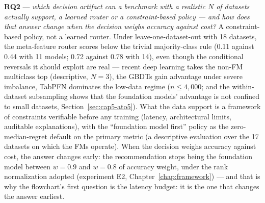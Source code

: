 \textbf{RQ2} --- \emph{which decision artifact can a benchmark with a
realistic $N$ of datasets actually support, a learned router or a
constraint-based policy --- and how does that answer change when the
decision weighs accuracy against cost?} A constraint-based policy,
not a learned router. Under leave-one-dataset-out with 18 datasets,
the meta-feature router scores below the trivial majority-class rule
(0.11 against 0.44 with 11 models; 0.72 against 0.78 with 14), even
though the conditional reversals it should exploit are real ---
recent deep learning takes the non-FM multiclass top (descriptive, $N{=}3$),
the GBDTs gain advantage under severe imbalance, TabPFN dominates the
low-data regime ($n \leq 4{,}000$; and the within-dataset subsampling
shows that the foundation models' advantage is not confined to small
datasets, Section~\ref{sec:cap5-ato5}). What the data support is a
framework of constraints verifiable before any training (latency,
architectural limits, auditable explanations), with the ``foundation model
first'' policy as the zero-median-regret default on the primary
metric (a descriptive evaluation over the 17 datasets on which the FMs operate). When the decision weighs accuracy against cost, the answer
changes early: the recommendation stops being the foundation model
between $w{=}0.9$ and $w{=}0.8$ of accuracy weight, under the rank
normalization adopted (experiment E2,
Chapter~\ref{chap:framework}) --- and that is why the flowchart's
first question is the latency budget: it is the one that changes the
answer earliest.

